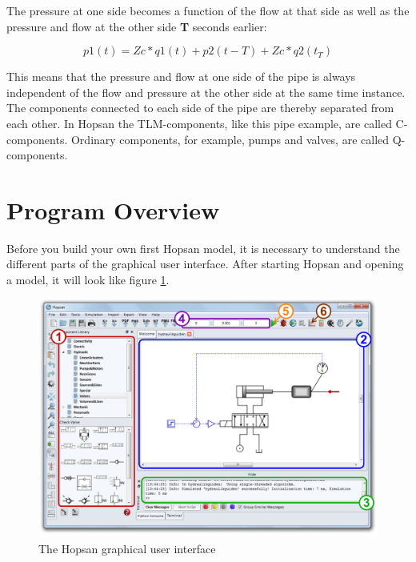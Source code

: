\documentclass[a4paper,pdftex]{article}
\begin{document}
\noindent The pressure at one side becomes a function of the flow at that side as well as the pressure and flow at the other side \textbf{T} seconds earlier:

\begin{equation}
 p1(t) = Zc*q1(t) + p2(t-T) + Zc*q2(t_T)
\end{equation}

\noindent This means that the pressure and flow at one side of the pipe is always independent of the flow and pressure at the other side at the same time instance.
The components connected to each side of the pipe are thereby separated from each other.
In Hopsan the TLM-components, like this pipe example, are called  C-components.
Ordinary components, for example, pumps and valves, are called Q-components.

\vfill
\section*{Program Overview}
Before you build your own first Hopsan model, it is necessary to understand the different parts of the graphical user interface.
After starting Hopsan and opening a model, it will look like figure \ref{fig:hopsan_gui}.  

\begin{figure}[ht]
  \centering
  \includegraphics[width=\textwidth]{gfx/screenshot.pdf}
  \caption{The Hopsan graphical user interface}
  \label{fig:hopsan_gui}
\end{figure}
\end{document}
